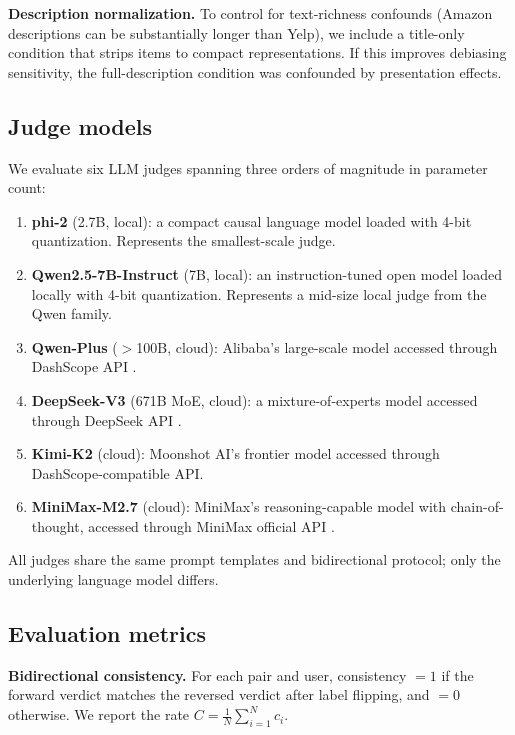 \documentclass[pdflatex,sn-basic,referee,lineno]{sn-jnl}
\begin{document}
\noindent\textbf{Description normalization.}  To control for text-richness confounds (Amazon descriptions can be substantially longer than Yelp), we include a title-only condition that strips items to compact representations. If this improves debiasing sensitivity, the full-description condition was confounded by presentation effects.

\subsection{Judge models}
\label{sec:judges}

We evaluate six LLM judges spanning three orders of magnitude in parameter count:

\begin{enumerate}
\item \textbf{phi-2} (2.7B, local): a compact causal language model \citep{gunasekar2023phi2} loaded with 4-bit quantization. Represents the smallest-scale judge.
\item \textbf{Qwen2.5-7B-Instruct} (7B, local): an instruction-tuned open model loaded locally with 4-bit quantization. Represents a mid-size local judge from the Qwen family.
\item \textbf{Qwen-Plus} ($>$100B, cloud): Alibaba's large-scale model accessed through DashScope API \citep{qwen2024technical}.
\item \textbf{DeepSeek-V3} (671B MoE, cloud): a mixture-of-experts model accessed through DeepSeek API \citep{deepseekai2025}.
\item \textbf{Kimi-K2} (cloud): Moonshot AI's frontier model accessed through DashScope-compatible API.
\item \textbf{MiniMax-M2.7} (cloud): MiniMax's reasoning-capable model with chain-of-thought, accessed through MiniMax official API \citep{minimax2025}.
\end{enumerate}

All judges share the same prompt templates and bidirectional protocol; only the underlying language model differs.

\subsection{Evaluation metrics}

\noindent\textbf{Bidirectional consistency.}  For each pair and user, consistency $= 1$ if the forward verdict matches the reversed verdict after label flipping, and $= 0$ otherwise. We report the rate $C = \frac{1}{N}\sum_{i=1}^N c_i$.
\end{document}
